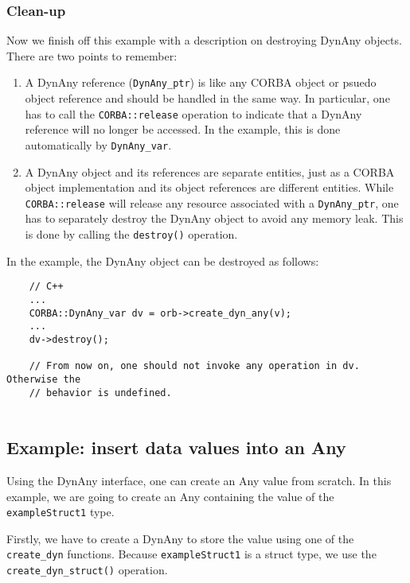 \documentclass[11pt,twoside,onecolumn]{book}
\begin{document}
\subsubsection{Clean-up}
Now we finish off this example with a description on destroying DynAny
objects. There are two points to remember:

\begin{enumerate}
\item A DynAny reference ({\tt DynAny\_ptr}) is like any CORBA object or
psuedo object reference and should be handled in the same way. In
particular, one has to call the {\tt CORBA::release} operation to indicate
that a DynAny reference will no longer be accessed. In the example, this is
done automatically by {\tt DynAny\_var}.
\item A DynAny object and its references are separate entities, just as a
CORBA object implementation and its object references are different
entities. While {\tt CORBA::release} will release any resource associated
with a {\tt DynAny\_ptr}, one has to separately destroy the DynAny object
to avoid any memory leak. This is done by calling the {\tt destroy()}
operation.
\end{enumerate}

In the example, the DynAny object can be destroyed as follows:

{\small
\begin{verbatim}
    // C++
    ...
    CORBA::DynAny_var dv = orb->create_dyn_any(v);
    ...
    dv->destroy();
    
    // From now on, one should not invoke any operation in dv. Otherwise the
    // behavior is undefined.
    
\end{verbatim}
}

\subsection{Example: insert data values into an Any}

Using the DynAny interface, one can create an Any value from scratch.  In
this example, we are going to create an Any containing the value of the
{\tt exampleStruct1} type.

Firstly, we have to create a DynAny to store the value using one of the
{\tt create\_dyn} functions. Because {\tt exampleStruct1} is a struct type, we
use the {\tt create\_dyn\_struct()} operation.
\end{document}
